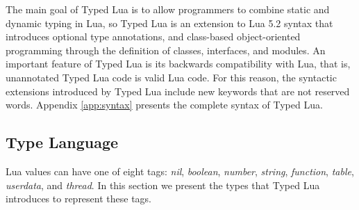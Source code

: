 The main goal of Typed Lua is to allow programmers to combine static
and dynamic typing in Lua, so Typed Lua is an extension to Lua 5.2
syntax that introduces optional type annotations, and class-based
object-oriented programming through the definition of classes,
interfaces, and modules.
An important feature of Typed Lua is its backwards compatibility with
Lua, that is, unannotated Typed Lua code is valid Lua code.
For this reason, the syntactic extensions introduced by Typed Lua
include new keywords that are not reserved words.
Appendix \ref{app:syntax} presents the complete syntax of Typed Lua. 

\subsection{Type Language}

Lua values can have one of eight tags:
\emph{nil}, \emph{boolean}, \emph{number}, \emph{string},
\emph{function}, \emph{table}, \emph{userdata}, and \emph{thread}.
In this section we present the types that Typed Lua introduces
to represent these tags.

